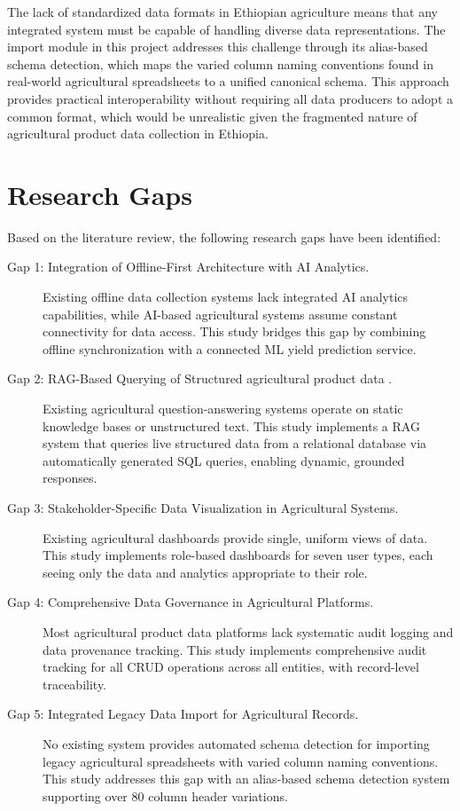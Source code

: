 \documentclass[12pt,a4paper,oneside]{report}
\begin{document}
The lack of standardized data formats in Ethiopian agriculture means that any integrated system must be capable of handling diverse data representations. The import module in this project addresses this challenge through its alias-based schema detection, which maps the varied column naming conventions found in real-world agricultural spreadsheets to a unified canonical schema. This approach provides practical interoperability without requiring all data producers to adopt a common format, which would be unrealistic given the fragmented nature of agricultural product data collection in Ethiopia.

\section{Research Gaps}
Based on the literature review, the following research gaps have been identified:

\begin{description}
  \item[Gap 1: Integration of Offline-First Architecture with AI Analytics.] Existing offline data collection systems \cite{islam2021} lack integrated AI analytics capabilities, while AI-based agricultural systems \cite{patel2020, shahhosseini2021} assume constant connectivity for data access. This study bridges this gap by combining offline synchronization with a connected ML yield prediction service.
  \item[Gap 2: RAG-Based Querying of Structured agricultural product data .] Existing agricultural question-answering systems operate on static knowledge bases or unstructured text. This study implements a RAG system that queries live structured data from a relational database via automatically generated SQL queries, enabling dynamic, grounded responses.
  \item[Gap 3: Stakeholder-Specific Data Visualization in Agricultural Systems.] Existing agricultural dashboards provide single, uniform views of data. This study implements role-based dashboards for seven user types, each seeing only the data and analytics appropriate to their role.
  \item[Gap 4: Comprehensive Data Governance in Agricultural Platforms.] Most agricultural product data platforms lack systematic audit logging and data provenance tracking. This study implements comprehensive audit tracking for all CRUD operations across all entities, with record-level traceability.
  \item[Gap 5: Integrated Legacy Data Import for Agricultural Records.] No existing system provides automated schema detection for importing legacy agricultural spreadsheets with varied column naming conventions. This study addresses this gap with an alias-based schema detection system supporting over 80 column header variations.
\end{description}
\end{document}
